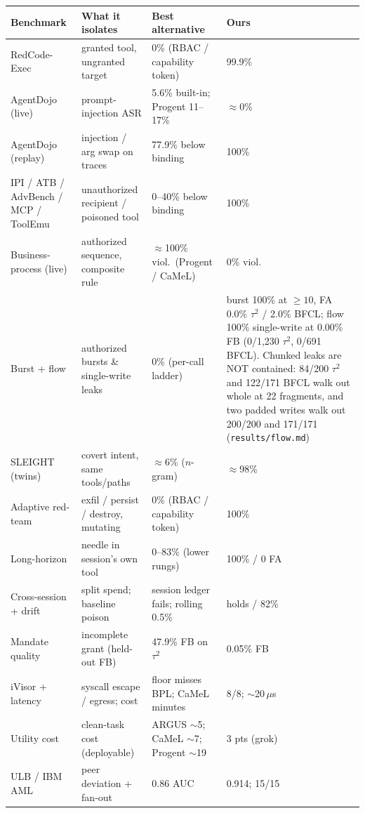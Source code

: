 \documentclass[11pt]{article}
\begin{document}
\pagestyle{empty}

\noindent
\begin{center}
{\footnotesize
\begin{tabular}{@{} B{3.05cm} I{3.55cm} P{5.1cm} R{2.35cm} @{}}
\toprule
\normalfont\bfseries Benchmark
  & \normalfont\bfseries What it isolates
  & \normalfont\bfseries Best alternative
  & \normalfont\bfseries Ours \\
\midrule
RedCode-Exec
  & granted tool, ungranted target
  & 0\% (RBAC / capability token)
  & 99.9\% \\
AgentDojo (live)
  & prompt-injection ASR
  & 5.6\% built-in; Progent 11--17\%
  & $\approx$0\% \\
AgentDojo (replay)
  & injection / arg swap on traces
  & 77.9\% below binding
  & 100\% \\
IPI / ATB / AdvBench / MCP / ToolEmu
  & unauthorized recipient / poisoned tool
  & 0--40\% below binding
  & 100\% \\
Business-process (live)
  & authorized sequence, composite rule
  & $\approx$100\% viol.\ (Progent / CaMeL)
  & 0\% viol. \\
Burst + flow
  & authorized bursts \& single-write leaks
  & 0\% (per-call ladder)
  & burst 100\% at ${\ge}10$, FA 0.0\% $\tau^2$ / 2.0\% BFCL;
    flow 100\% single-write at 0.00\% FB (0/1{,}230 $\tau^2$,
    0/691 BFCL). Chunked leaks are NOT contained: 84/200 $\tau^2$
    and 122/171 BFCL walk out whole at 22 fragments, and two
    padded writes walk out 200/200 and 171/171
    (\texttt{results/flow.md}) \\
SLEIGHT (twins)
  & covert intent, same tools/paths
  & $\approx$6\% ($n$-gram)
  & $\approx$98\% \\
Adaptive red-team
  & exfil / persist / destroy, mutating
  & 0\% (RBAC / capability token)
  & 100\% \\
Long-horizon
  & needle in session's own tool
  & 0--83\% (lower rungs)
  & 100\% / 0 FA \\
Cross-session + drift
  & split spend; baseline poison
  & session ledger fails; rolling 0.5\%
  & holds / 82\% \\
Mandate quality
  & incomplete grant (held-out FB)
  & 47.9\% FB on $\tau^2$
  & 0.05\% FB \\
iVisor + latency
  & syscall escape / egress; cost
  & floor misses BPL; CaMeL minutes
  & 8/8; $\sim$20\,$\mu$s \\
Utility cost
  & clean-task cost (deployable)
  & ARGUS $\sim$5; CaMeL $\sim$7; Progent $\sim$19
  & 3 pts (grok) \\
ULB / IBM AML
  & peer deviation + fan-out
  & 0.86 AUC
  & 0.914; 15/15 \\
\bottomrule
\end{tabular}
}
\end{center}
\end{document}
